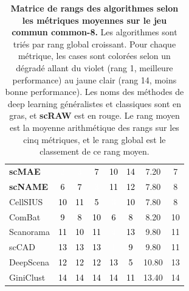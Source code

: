 \begin{table}[!htbp]
\begin{tabular}{l ccccc c c}
\textbf{scMAE} & \cellcolor{rankcol2}\textcolor{white}{2} & \cellcolor{rankcol3}\textcolor{white}{3} & \cellcolor{rankcol7}\textcolor{black}{7} & \cellcolor{rankcol10}\textcolor{black}{10} & \cellcolor{rankcol14}\textcolor{black}{14} & 7.20 & 7 \\
\textbf{scNAME} & \cellcolor{rankcol6}\textcolor{black}{6} & \cellcolor{rankcol7}\textcolor{black}{7} & \cellcolor{rankcol3}\textcolor{white}{3} & \cellcolor{rankcol11}\textcolor{black}{11} & \cellcolor{rankcol12}\textcolor{black}{12} & 7.80 & 8 \\
CellSIUS & \cellcolor{rankcol10}\textcolor{black}{10} & \cellcolor{rankcol11}\textcolor{black}{11} & \cellcolor{rankcol5}\textcolor{black}{5} & \cellcolor{rankcol3}\textcolor{white}{3} & \cellcolor{rankcol10}\textcolor{black}{10} & 7.80 & 8 \\
ComBat & \cellcolor{rankcol9}\textcolor{black}{9} & \cellcolor{rankcol8}\textcolor{black}{8} & \cellcolor{rankcol10}\textcolor{black}{10} & \cellcolor{rankcol6}\textcolor{black}{6} & \cellcolor{rankcol8}\textcolor{black}{8} & 8.20 & 10 \\
Scanorama & \cellcolor{rankcol11}\textcolor{black}{11} & \cellcolor{rankcol10}\textcolor{black}{10} & \cellcolor{rankcol11}\textcolor{black}{11} & \cellcolor{rankcol4}\textcolor{white}{4} & \cellcolor{rankcol13}\textcolor{black}{13} & 9.80 & 11 \\
scCAD & \cellcolor{rankcol13}\textcolor{black}{13} & \cellcolor{rankcol13}\textcolor{black}{13} & \cellcolor{rankcol13}\textcolor{black}{13} & \cellcolor{rankcol1}\textcolor{white}{1} & \cellcolor{rankcol9}\textcolor{black}{9} & 9.80 & 11 \\
DeepScena & \cellcolor{rankcol12}\textcolor{black}{12} & \cellcolor{rankcol12}\textcolor{black}{12} & \cellcolor{rankcol12}\textcolor{black}{12} & \cellcolor{rankcol13}\textcolor{black}{13} & \cellcolor{rankcol5}\textcolor{black}{5} & 10.80 & 13 \\
GiniClust & \cellcolor{rankcol14}\textcolor{black}{14} & \cellcolor{rankcol14}\textcolor{black}{14} & \cellcolor{rankcol14}\textcolor{black}{14} & \cellcolor{rankcol14}\textcolor{black}{14} & \cellcolor{rankcol11}\textcolor{black}{11} & 13.40 & 14 \\
\bottomrule
\end{tabular}
\caption[Matrice de rangs des algorithmes selon les métriques moyennes sur le jeu commun common-8.]{%
    \textbf{Matrice de rangs des algorithmes selon les métriques moyennes sur le jeu commun common-8.}
    Les algorithmes sont triés par rang global croissant. Pour chaque métrique, les cases sont colorées selon un dégradé 
    allant du violet (rang 1, meilleure performance) au jaune clair (rang 14, moins bonne performance). 
    Les noms des méthodes de deep learning généralistes et classiques sont en gras, et \textbf{scRAW} est en rouge. 
    Le rang moyen est la moyenne arithmétique des rangs sur les cinq métriques, et le rang global est le classement de ce rang moyen.%
}
\label{tab:rank_matrix_common8}
\end{table}
